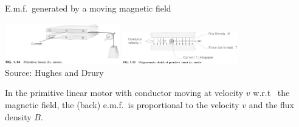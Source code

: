 \documentclass[dvisvgm,hypertex,aspectratio=169]{beamer}
\begin{document}
\begin{frame}{E.m.f.~generated by a moving magnetic field}
\begin{center}
\includegraphics[width=5cm]{HD-fig1_14.png}
\includegraphics[width=5cm]{HD-fig1_15.png}\\
{\footnotesize Source: Hughes and Drury}
\end{center}

In the primitive linear motor with conductor moving at velocity $v$ w.r.t~ the magnetic field, the (back) e.m.f.~is proportional to the velocity $v$ and the flux density $B$.

\end{frame}
\end{document}
